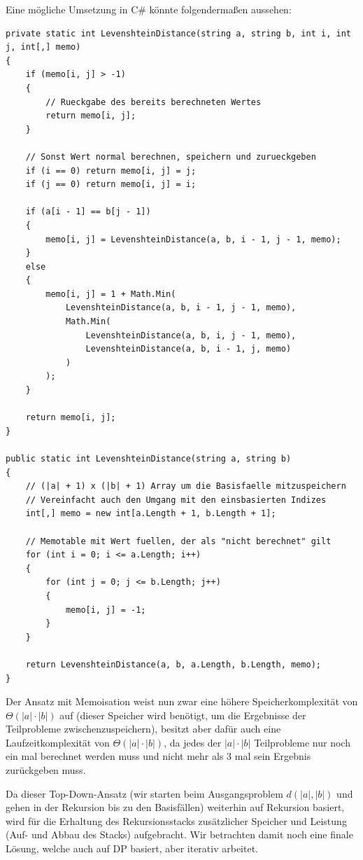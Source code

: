 \documentclass{whswinvcbook}
\begin{document}
Eine mögliche Umsetzung in C\# könnte folgendermaßen aussehen:
\begin{lstlisting}[caption=Levenshtein-Distanz mit Memoisation, label=lst:levenshtein_memoization]
private static int LevenshteinDistance(string a, string b, int i, int j, int[,] memo)
{
    if (memo[i, j] > -1)
    {
        // Rueckgabe des bereits berechneten Wertes
        return memo[i, j];
    }

    // Sonst Wert normal berechnen, speichern und zurueckgeben
    if (i == 0) return memo[i, j] = j;
    if (j == 0) return memo[i, j] = i;

    if (a[i - 1] == b[j - 1])
    {
        memo[i, j] = LevenshteinDistance(a, b, i - 1, j - 1, memo);
    }
    else
    {
        memo[i, j] = 1 + Math.Min(
            LevenshteinDistance(a, b, i - 1, j - 1, memo),
            Math.Min(
                LevenshteinDistance(a, b, i, j - 1, memo),
                LevenshteinDistance(a, b, i - 1, j, memo)
            )
        );
    }

    return memo[i, j];
}

public static int LevenshteinDistance(string a, string b)
{
    // (|a| + 1) x (|b| + 1) Array um die Basisfaelle mitzuspeichern
    // Vereinfacht auch den Umgang mit den einsbasierten Indizes
    int[,] memo = new int[a.Length + 1, b.Length + 1];

    // Memotable mit Wert fuellen, der als "nicht berechnet" gilt
    for (int i = 0; i <= a.Length; i++)
    {
        for (int j = 0; j <= b.Length; j++)
        {
            memo[i, j] = -1;
        }
    }

    return LevenshteinDistance(a, b, a.Length, b.Length, memo);
}
\end{lstlisting}
Der Ansatz mit Memoisation weist nun zwar eine höhere Speicherkomplexität von $\Theta(|a|\cdot|b|)$ auf (dieser Speicher wird benötigt, um die Ergebnisse der Teilprobleme zwischenzuspeichern), besitzt aber dafür auch eine Laufzeitkomplexität von $\Theta(|a|\cdot|b|)$, da jedes der $|a|\cdot|b|$ Teilprobleme nur noch ein mal berechnet werden muss und nicht mehr als $3$ mal sein Ergebnis zurückgeben muss.

Da dieser Top-Down-Ansatz (wir starten beim Ausgangsproblem $d(|a|,|b|)$ und gehen in der Rekursion bis zu den Basisfällen) weiterhin auf Rekursion basiert, wird für die Erhaltung des Rekursionsstacks zusätzlicher Speicher und Leistung (Auf- und Abbau des Stacks) aufgebracht. Wir betrachten damit noch eine finale Lösung, welche auch auf DP basiert, aber iterativ arbeitet.
\end{document}
